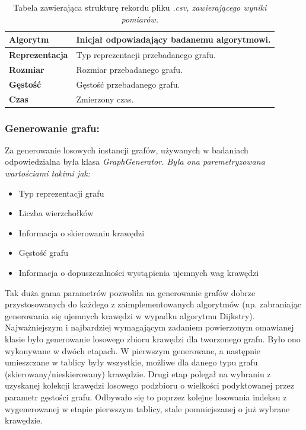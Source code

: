 \documentclass[a4paper,12pt]{article}
\begin{document}
\begin{table}[H]
	\centering
	\label{tab.wynik-pomairu}
	\caption{\centering Tabela zawierająca strukturę rekordu pliku \it *.csv\rm, zawierającego wyniki pomiarów.}
	\begin{tabular}{|l|l|}
		\hline
		\textbf{Algorytm}      & Inicjał odpowiadający badanemu algorytmowi. \\ \hline
		\textbf{Reprezentacja} & Typ reprezentacji przebadanego grafu.       \\ \hline
		\textbf{Rozmiar}       & Rozmiar przebadanego grafu.                 \\ \hline
		\textbf{Gęstość}       & Gęstość przebadanego grafu.                 \\ \hline
		\textbf{Czas}          & Zmierzony czas.                             \\ \hline
	\end{tabular}
\end{table}

\subsubsection{Generowanie grafu:}
Za generowanie losowych instancji grafów, używanych w badaniach odpowiedzialna była klasa \it GraphGenerator\rm. Była ona paremetryzowana wartościami takimi jak:
\begin{itemize}
	\item Typ reprezentacji grafu
	\item Liczba wierzchołków
	\item Informacja o skierowaniu krawędzi
	\item Gęstość grafu
	\item Informacja o dopuszczalności wystąpienia ujemnych wag krawędzi
\end{itemize}
\vspace{5mm}

\noindent
Tak duża gama parametrów pozwoliła na generowanie grafów dobrze przystosowanych do każdego z zaimplementowanych algorytmów (np. zabraniając generowania się ujemnych krawędzi w wypadku algorytmu Dijkstry).\\

\noindent
Najważniejszym i najbardziej wymagającym zadaniem powierzonym omawianej klasie było generowanie losowego zbioru krawędzi dla tworzonego grafu. Było ono wykonywane w dwóch etapach. W pierwszym generowane, a następnie umieszczane w tablicy były wszystkie, możliwe dla danego typu grafu (skierowany/nieskierowany) krawędzie. Drugi etap polegał na wybraniu z uzyskanej kolekcji krawędzi losowego podzbioru o wielkości podyktowanej przez parametr gęstości grafu. Odbywało się to poprzez kolejne losowania indeksu z wygenerowanej w etapie pierwszym tablicy, stale pomniejszanej o już wybrane krawędzie. 
\end{document}
